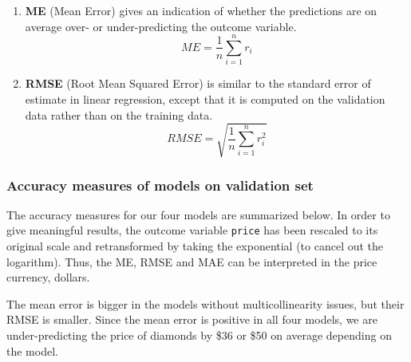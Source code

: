 \documentclass[
  paper=a4,
  ,captions=tableheading
]{scrartcl}
\providecommand{\tightlist}{%
  \setlength{\itemsep}{0pt}\setlength{\parskip}{0pt}}
\begin{document}
\begin{enumerate}
\def\labelenumi{\arabic{enumi}.}
\tightlist
\item
  \textbf{ME} (Mean Error) gives an indication of whether the
  predictions are on average over- or under-predicting the outcome
  variable. \[ME = \dfrac{1}{n} \sum_{i=1}^{n}r_i\]
\item
  \textbf{RMSE} (Root Mean Squared Error) is similar to the standard
  error of estimate in linear regression, except that it is computed on
  the validation data rather than on the training data.
  \[RMSE =  \sqrt{\dfrac{1}{n}\sum_{i=1}^{n}r_i^2}\]
\end{enumerate}

\hypertarget{accuracy-measures-of-models-on-validation-set}{%
\subsubsection{Accuracy measures of models on validation
set}\label{accuracy-measures-of-models-on-validation-set}}

The accuracy measures for our four models are summarized below. In order
to give meaningful results, the outcome variable \texttt{price} has been
rescaled to its original scale and retransformed by taking the
exponential (to cancel out the logarithm). Thus, the ME, RMSE and MAE
can be interpreted in the price currency, dollars.

\begin{table}[!h]

\caption{\label{tab:models-accuracy-table}Accuracy measures of linear models}
\centering
{}
\end{table}

The mean error is bigger in the models without multicollinearity issues,
but their RMSE is smaller. Since the mean error is positive in all four
models, we are under-predicting the price of diamonds by \$36 or \$50 on
average depending on the model.
\end{document}
